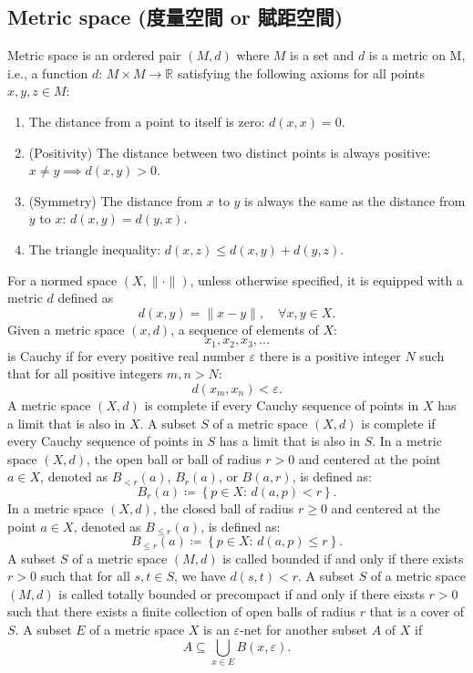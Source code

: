 \documentclass[a4paper,12pt]{article}
\begin{document}
\subsection{Metric space (度量空間 or 賦距空間)}
Metric space is an ordered pair $(M, d)$ where $M$ is a set and $d$ is a metric on M, i.e., a function $d:\,M\times M\to\mathbb{R}$ satisfying the following axioms for all points $x,y,z\in M$:
\begin{enumerate}
\item The distance from a point to itself is zero: $d(x,x)=0$.
\item (Positivity) The distance between two distinct points is always positive:$x\neq y\implies d(x,y)>0$.
\item (Symmetry) The distance from $x$ to $y$ is always the same as the distance from $y$ to $x$: $d(x,y)=d(y,x)$.
\item The triangle inequality: $d(x,z)\leq d(x,y)+d(y,z)$.
\end{enumerate}

For a normed space $(X,\|\cdot\|)$, unless otherwise specified, it is equipped with a metric $d$ defined as
\[d(x,y)=\|x-y\|,\quad \forall x,y\in X.\]
Given a metric space $(x,d)$, a sequence of elements of $X$:
\[x_1,x_2,x_3,\ldots\]
is Cauchy if for every positive real number $\varepsilon$ there is a positive integer $N$ such that for all positive integers $m,n>N$:
\[d\left(x_m,x_n\right)<\varepsilon.\]
A metric space $(X,d)$ is complete if every Cauchy sequence of points in $X$ has a limit that is also in $X$.
A subset $S$ of a metric space $(X,d)$ is complete if every Cauchy sequence of points in $S$ has a limit that is also in $S$.
In a metric space $(X,d)$, the open ball or ball of radius $r>0$ and centered at the point $a\in X$, denoted as $B_{<r}(a)$, $B_{r}(a)$, or $B(a,r)$, is defined as:
\[B_{r}(a)\coloneq\left\{p\in X:\, d(a,p)<r\right\}.\]
In a metric space $(X,d)$, the closed ball of radius $r\geq 0$ and centered at the point $a\in X$, denoted as $B_{\leq r}(a)$, is defined as:
\[B_{\leq r}(a)\coloneq\left\{p\in X:\, d(a,p)\leq r\right\}.\]
A subset $S$ of a metric space $(M, d)$ is called bounded if and only if there exists $r > 0$ such that for all $s,t\in S$, we have $d(s, t) < r$.
A subset $S$ of a metric space $(M, d)$ is called totally bounded or precompact if and only if there eixsts $r>0$ such that there exists a finite collection of open balls of radius $r$ that is a cover of $S$.
A subset $E$ of a metric space $X$ is an $\varepsilon$-net for another subset $A$ of $X$ if
\[A\subseteq\bigcup_{x\in E}B(x,\varepsilon).\]
\end{document}

